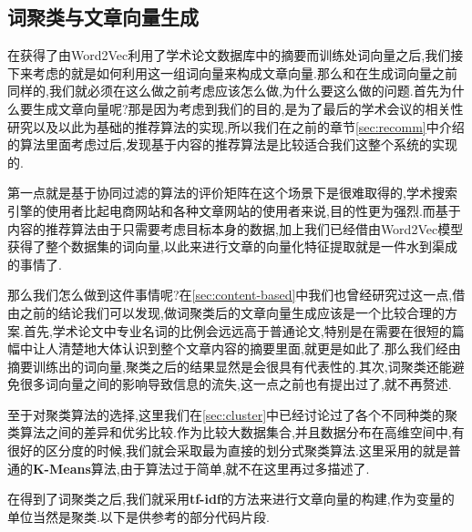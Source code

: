 \subsection{词聚类与文章向量生成}

在获得了由Word2Vec利用了学术论文数据库中的摘要而训练处词向量之后,我们接下来考虑的就是如何利用这一组词向量来构成文章向量.那么和在生成词向量之前同样的,我们就必须在这么做之前考虑应该怎么做,为什么要这么做的问题.首先为什么要生成文章向量呢?那是因为考虑到我们的目的,是为了最后的学术会议的相关性研究以及以此为基础的推荐算法的实现,所以我们在之前的章节\ref{sec:recomm}中介绍的算法里面考虑过后,发现基于内容的推荐算法是比较适合我们这整个系统的实现的.

第一点就是基于协同过滤的算法的评价矩阵在这个场景下是很难取得的,学术搜索引擎的使用者比起电商网站和各种文章网站的使用者来说,目的性更为强烈.而基于内容的推荐算法由于只需要考虑目标本身的数据,加上我们已经借由Word2Vec模型获得了整个数据集的词向量,以此来进行文章的向量化特征提取就是一件水到渠成的事情了.

那么我们怎么做到这件事情呢?在\ref{sec:content-based}中我们也曾经研究过这一点,借由之前的结论我们可以发现,做词聚类后的文章向量生成应该是一个比较合理的方案.首先,学术论文中专业名词的比例会远远高于普通论文,特别是在需要在很短的篇幅中让人清楚地大体认识到整个文章内容的摘要里面,就更是如此了.那么我们经由摘要训练出的词向量,聚类之后的结果显然是会很具有代表性的.其次,词聚类还能避免很多词向量之间的影响导致信息的流失,这一点之前也有提出过了,就不再赘述.

至于对聚类算法的选择,这里我们在\ref{sec:cluster}中已经讨论过了各个不同种类的聚类算法之间的差异和优劣比较.作为比较大数据集合,并且数据分布在高维空间中,有很好的区分度的时候,我们就会采取最为直接的划分式聚类算法.这里采用的就是普通的\textbf{K-Means}算法,由于算法过于简单,就不在这里再过多描述了.

在得到了词聚类之后,我们就采用\textbf{tf-idf}的方法来进行文章向量的构建,作为变量的单位当然是聚类.以下是供参考的部分代码片段.

